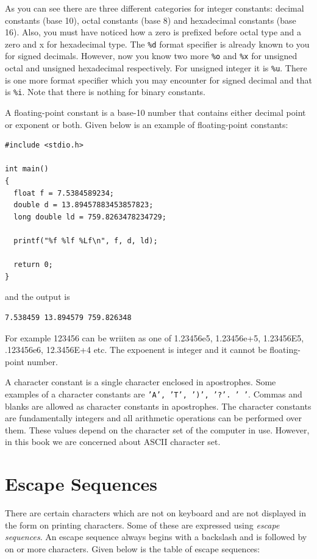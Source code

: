 As you can see there are three different categories for integer constants:
decimal constants (base 10), octal constants (base 8) and hexadecimal constants
(base 16). Also, you must have noticed how a zero is prefixed before octal type
and a zero and x for hexadecimal type. The \texttt{\%d} format specifier is
already known to you for signed decimals. However, now you know two more
\texttt{\%o} and \texttt{\%x} for unsigned octal and unsigned hexadecimal
respectively. For unsigned integer it is \texttt{\%u}. There is one more format
specifier which you may encounter for signed decimal and that is
\texttt{\%i}. Note that there is nothing for binary constants.

A floating-point constant is a base-10 number that contains either decimal
point or exponent or both. Given below is an example of floating-point
constants:

\begin{Verbatim}[frame=single]
#include <stdio.h>

int main()
{
  float f = 7.5384589234;
  double d = 13.89457883453857823;
  long double ld = 759.8263478234729;

  printf("%f %lf %Lf\n", f, d, ld);

  return 0;
}
\end{Verbatim}

and the output is

\begin{Verbatim}[frame=single]
7.538459 13.894579 759.826348
\end{Verbatim}

For example 123456 can be wriiten as one of 1.23456e5, 1.23456e+5, 1.23456E5,
.123456e6, 12.3456E+4 etc. The expoenent is integer and it cannot be
floating-point number.

A character constant is a single character enclosed in apostrophes. Some
examples of a character constants are \texttt{'A', 'T', ')', '?'. ' '}. Commas
and blanks are allowed as character constants in apostrophes. The character
constants are fundamentally integers and all arithmetic operations can be
performed over them. These values depend on the character set of the computer
in use. However, in this book we are concerned about ASCII character set.

\section{Escape Sequences}
There are certain characters which are not on keyboard and are not displayed in
the form on printing characters. Some of these are expressed using
\textit{escape sequences}. An escape sequence always begins with a backslash
and is followed by on or more characters. Given below is the table of escape
sequences:

